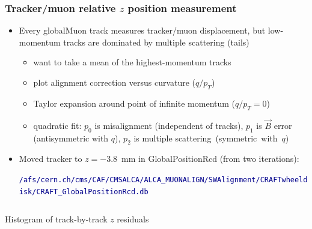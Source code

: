 \documentclass[compress]{beamer}
\begin{document}
\scriptsize

\begin{frame}
\frametitle{Tracker/muon relative $z$ position measurement}
\begin{itemize}\setlength{\itemsep}{0.1 cm}
\item Every globalMuon track measures tracker/muon displacement, but
  low-momentum tracks are dominated by multiple scattering (tails)

\vspace{0.05 cm}
\begin{itemize}\scriptsize\setlength{\itemsep}{0.1 cm}
\item want to take a mean of the highest-momentum tracks
\item plot alignment correction versus curvature ($q/p_T$)
\item Taylor expansion around point of infinite momentum ($q/p_T = 0$)
\item quadratic fit: $p_0$ is misalignment (independent of tracks), $p_1$ is $\vec{B}$ error (antisymmetric with $q$), $p_2$ is multiple \mbox{scattering (symmetric with $q$)\hspace{-1 cm}}
\end{itemize}

\item Moved tracker to $z = -3.8$~mm in GlobalPositionRcd (from two iterations):

\textcolor{darkblue}{\tiny \tt /afs/cern.ch/cms/CAF/CMSALCA/ALCA\_MUONALIGN/SWAlignment/CRAFTwheeldisk/CRAFT\_GlobalPositionRcd.db}
\end{itemize}

\vspace{0.1 cm}
\begin{columns}
Histogram of track-by-track $z$ residuals


\end{columns}
\end{frame}
\end{document}
